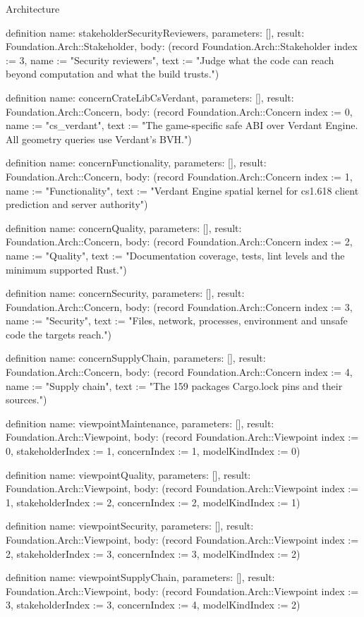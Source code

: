 \begin{lexlean}{Architecture}
\begin{semanticmodule}
definition{
  name: stakeholderSecurityReviewers,
  parameters: [],
  result: Foundation.Arch::Stakeholder,
  body: (record Foundation.Arch::Stakeholder {index := 3, name := "Security reviewers", text := "Judge what the code can reach beyond computation and what the build trusts."})
}

definition{
  name: concernCrateLibCsVerdant,
  parameters: [],
  result: Foundation.Arch::Concern,
  body: (record Foundation.Arch::Concern {index := 0, name := "cs_verdant", text := "The game-specific safe ABI over Verdant Engine. All geometry queries use Verdant's BVH."})
}

definition{
  name: concernFunctionality,
  parameters: [],
  result: Foundation.Arch::Concern,
  body: (record Foundation.Arch::Concern {index := 1, name := "Functionality", text := "Verdant Engine spatial kernel for cs1.618 client prediction and server authority"})
}

definition{
  name: concernQuality,
  parameters: [],
  result: Foundation.Arch::Concern,
  body: (record Foundation.Arch::Concern {index := 2, name := "Quality", text := "Documentation coverage, tests, lint levels and the minimum supported Rust."})
}

definition{
  name: concernSecurity,
  parameters: [],
  result: Foundation.Arch::Concern,
  body: (record Foundation.Arch::Concern {index := 3, name := "Security", text := "Files, network, processes, environment and unsafe code the targets reach."})
}

definition{
  name: concernSupplyChain,
  parameters: [],
  result: Foundation.Arch::Concern,
  body: (record Foundation.Arch::Concern {index := 4, name := "Supply chain", text := "The 159 packages Cargo.lock pins and their sources."})
}

definition{
  name: viewpointMaintenance,
  parameters: [],
  result: Foundation.Arch::Viewpoint,
  body: (record Foundation.Arch::Viewpoint {index := 0, stakeholderIndex := 1, concernIndex := 1, modelKindIndex := 0})
}

definition{
  name: viewpointQuality,
  parameters: [],
  result: Foundation.Arch::Viewpoint,
  body: (record Foundation.Arch::Viewpoint {index := 1, stakeholderIndex := 2, concernIndex := 2, modelKindIndex := 1})
}

definition{
  name: viewpointSecurity,
  parameters: [],
  result: Foundation.Arch::Viewpoint,
  body: (record Foundation.Arch::Viewpoint {index := 2, stakeholderIndex := 3, concernIndex := 3, modelKindIndex := 2})
}

definition{
  name: viewpointSupplyChain,
  parameters: [],
  result: Foundation.Arch::Viewpoint,
  body: (record Foundation.Arch::Viewpoint {index := 3, stakeholderIndex := 3, concernIndex := 4, modelKindIndex := 2})
}


\end{semanticmodule}
\end{lexlean}

